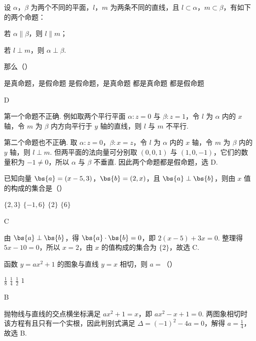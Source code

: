\begin{problem}
设 \(\alpha\)，\(\beta\) 为两个不同的平面，\(l\)，\(m\) 为两条不同的直线，且 \(l \subset \alpha\)，\(m \subset \beta\)，有如下的两个命题：
\begin{circlelist}
\item 若 \(\alpha \parallel \beta\)，则 \(l \parallel m\)；
\item 若 \(l \perp m\)，则 \(\alpha \perp \beta\).
\end{circlelist}
那么（\quad）

\choices
    {是真命题，是假命题}
    {是假命题，是真命题}
    {都是真命题}
    {都是假命题}

\begin{answer}
D
\end{answer}

\begin{solution}
第一个命题不正确. 例如取两个平行平面 \(\alpha:z=0\) 与 \(\beta:z=1\)，令 \(l\) 为 \(\alpha\) 内的 \(x\) 轴，令 \(m\) 为 \(\beta\) 内方向平行于 \(y\) 轴的直线，则 \(l\) 与 \(m\) 不平行.

第二个命题也不正确. 取 \(\alpha:z=0\)，\(\beta:x=z\)，令 \(l\) 为 \(\alpha\) 内的 \(x\) 轴，令 \(m\) 为 \(\beta\) 内的 \(y\) 轴，则 \(l\perp m\). 但两平面的法向量可分别取 \((0,0,1)\) 与 \((1,0,-1)\)，它们的数量积为 \(-1\ne0\)，所以 \(\alpha\) 与 \(\beta\) 不垂直. 因此两个命题都是假命题，选 D.
\end{solution}
\end{problem}

\begin{problem}
已知向量 \(\bs{a} = (x - 5, 3)\)，\(\bs{b} = (2, x)\)，且 \(\bs{a} \perp \bs{b}\)，则由 \(x\) 值的构成的集合是（\quad）

\choices
    {\( \{2,3\} \)}
    {\(\{-1,6\}\)}
    {\( \{2\} \)}
    {\( \{6\} \)}

\begin{answer}
C
\end{answer}

\begin{solution}
由 \(\bs{a}\perp\bs{b}\)，得 \(\bs{a}\cdot\bs{b}=0\)，即
\(2(x-5)+3x=0\). 整理得 \(5x-10=0\)，所以 \(x=2\)，由 \(x\) 的值构成的集合为 \(\{2\}\)，故选 C.
\end{solution}
\end{problem}

\begin{problem}
函数 \( y = ax^{2} + 1 \) 的图象与直线 \( y = x \) 相切，则 \( a = \)（\quad）

\choices
    {\( \frac{1}{8} \)}
    {\( \frac{1}{4} \)}
    {\( \frac{1}{2} \)}
    {\(1\)}

\begin{answer}
B
\end{answer}

\begin{solution}
抛物线与直线的交点横坐标满足 \(ax^2+1=x\)，即 \(ax^2-x+1=0\). 两图象相切时该方程有且只有一个实根，因此判别式满足 \(\Delta=(-1)^2-4a=0\)，解得 \(a=\frac{1}{4}\)，故选 B.
\end{solution}
\end{problem}

